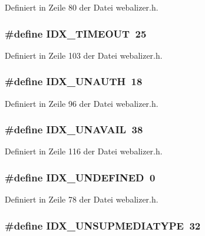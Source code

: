 Definiert in Zeile 80 der Datei webalizer.h.
\subsubsection{\setlength{\rightskip}{0pt plus 5cm}\#define IDX\_\-TIMEOUT~25}\label{webalizer_8h_c6815df17d8a5de1d1d9f2cfebc54549}




Definiert in Zeile 103 der Datei webalizer.h.
\subsubsection{\setlength{\rightskip}{0pt plus 5cm}\#define IDX\_\-UNAUTH~18}\label{webalizer_8h_8ea05eb3e8a1b38e57de383d26c37504}




Definiert in Zeile 96 der Datei webalizer.h.
\subsubsection{\setlength{\rightskip}{0pt plus 5cm}\#define IDX\_\-UNAVAIL~38}\label{webalizer_8h_e22b7bcbc25b5d27c2f17f513e5fb470}




Definiert in Zeile 116 der Datei webalizer.h.
\subsubsection{\setlength{\rightskip}{0pt plus 5cm}\#define IDX\_\-UNDEFINED~0}\label{webalizer_8h_b93bf51da9eb22f9c1137af150b41875}




Definiert in Zeile 78 der Datei webalizer.h.
\subsubsection{\setlength{\rightskip}{0pt plus 5cm}\#define IDX\_\-UNSUPMEDIATYPE~32}\label{webalizer_8h_e11d6a0f8e87a7188ecc2d97b40e6027}




